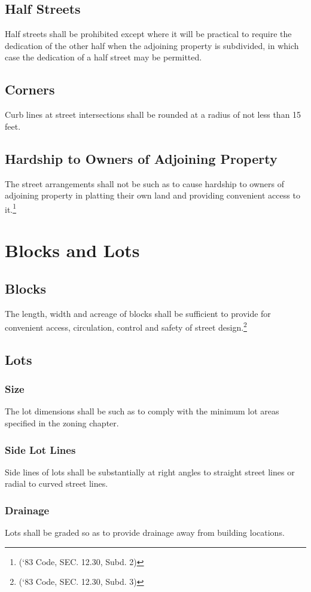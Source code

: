 \subsection{Half Streets}
Half streets shall be prohibited except where it will be practical to require the dedication of the other half when the adjoining property is subdivided, in which case the dedication of a half street may be permitted.
\subsection{Corners}
Curb lines at street intersections shall be rounded at a radius of not less than 15 feet.
\subsection{Hardship to Owners of Adjoining Property}
The street arrangements shall not be such as to cause hardship to owners of adjoining property in platting their own land and providing convenient access to it.\footnote{(‘83 Code, SEC. 12.30, Subd. 2)}

\section{Blocks and Lots}
\subsection{Blocks}
The length, width and acreage of blocks shall be sufficient to provide for convenient access, circulation, control and safety of street design.\footnote{(‘83 Code, SEC. 12.30, Subd. 3)}
\subsection{Lots}
\subsubsection{Size}
The lot dimensions shall be such as to comply with the minimum lot areas specified in the zoning chapter.
\subsubsection{Side Lot Lines}
Side lines of lots shall be substantially at right angles to straight street lines or radial to curved street lines.
\subsubsection{Drainage}
Lots shall be graded so as to provide drainage away from building locations.
